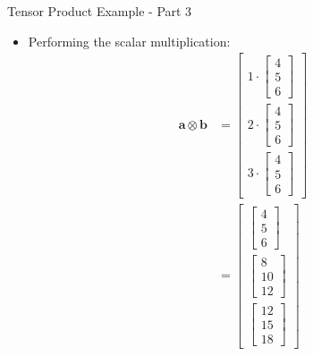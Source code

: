 \documentclass{beamer}
\begin{document}
\begin{frame}{Tensor Product Example - Part 3}
\footnotesize
\begin{itemize}
\item Performing the scalar multiplication:
\begin{align*}
\mathbf{a} \otimes \mathbf{b} &= \begin{bmatrix} 1 \cdot \begin{bmatrix} 4 \\ 5 \\ 6 \end{bmatrix} \\ 2 \cdot \begin{bmatrix} 4 \\ 5 \\ 6 \end{bmatrix} \\ 3 \cdot \begin{bmatrix} 4 \\ 5 \\ 6 \end{bmatrix} \end{bmatrix} \\
&= \begin{bmatrix} \begin{bmatrix} 4 \\ 5 \\ 6 \end{bmatrix} \\ \begin{bmatrix} 8 \\ 10 \\ 12 \end{bmatrix} \\ \begin{bmatrix} 12 \\ 15 \\ 18 \end{bmatrix} \end{bmatrix}
\end{align*}
\end{itemize}
\end{frame}
\end{document}

